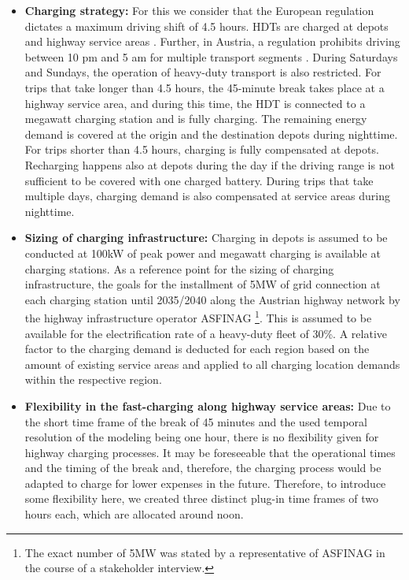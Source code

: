 \documentclass[final,10pt]{elsarticle}
\begin{document}
            \begin{itemize}
                \item \textbf{Charging strategy:} For this we consider that the European regulation dictates a maximum driving shift of 4.5 hours. \ac{HDT}s are charged at depots and highway service areas \cite{ec_driving_time_2023}. Further, in Austria, a regulation prohibits driving between 10 pm and 5 am for multiple transport segments \cite{usp_lkw_fahrverbote}. During Saturdays and Sundays, the operation of heavy-duty transport is also restricted. For trips that take longer than 4.5 hours, the 45-minute break takes place at a highway service area, and during this time, the \ac{HDT} is connected to a megawatt charging station and is fully charging. The remaining energy demand is covered at the origin and the destination depots during nighttime. For trips shorter than 4.5 hours, charging is fully compensated at depots. Recharging happens also at depots during the day if the driving range is not sufficient to be covered with one charged battery. During trips that take multiple days, charging demand is also compensated at service areas during nighttime. 

                \item \textbf{Sizing of charging infrastructure:} Charging in depots is assumed to be conducted at 100kW of peak power and megawatt charging is available at charging stations. As a reference point for the sizing of charging infrastructure, the goals for the installment of 5MW of grid connection at each charging station until 2035/2040 along the Austrian highway network by the highway infrastructure operator ASFINAG \cite{ioebenergiespeicher}\footnote{The exact number of 5MW was stated by a representative of ASFINAG in the course of a stakeholder interview.}. This is assumed to be available for the electrification rate of a heavy-duty fleet of 30\%. A relative factor to the charging demand is deducted for each region based on the amount of existing service areas and applied to all charging location demands within the respective region. 

                \item \textbf{Flexibility in the fast-charging along highway service areas:} Due to the short time frame of the break of 45 minutes and the used temporal resolution of the modeling being one hour, there is no flexibility given for highway charging processes. It may be foreseeable that the operational times and the timing of the break and, therefore, the charging process would be adapted to charge for lower expenses in the future. Therefore, to introduce some flexibility here, we created three distinct plug-in time frames of two hours each, which are allocated around noon. 
        
            \end{itemize}
            
\end{document}
